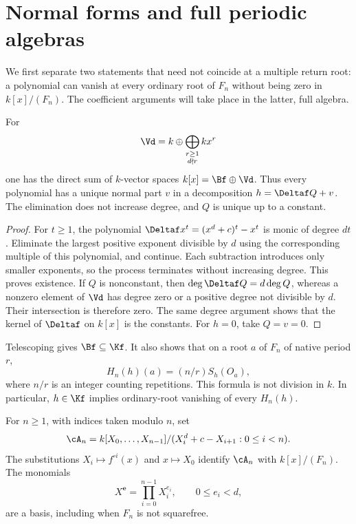\section{Normal forms and full periodic algebras}
\label{sec:algebra}

We first separate two statements that need not coincide at a
multiple return root: a polynomial can vanish at every ordinary
root of $F_n$ without being zero in $k[x]/(F_n)$. The coefficient
arguments will take place in the latter, full algebra.

\begin{lemma}
\label{lem:normal}
For
\[
 \Vd=k\oplus\bigoplus_{\substack{r\ge1\\d\nmid r}}kx^r
\]
one has the direct sum of $k$-vector spaces
$k[x]=\Bf\oplus\Vd$. Thus every polynomial has a unique normal
part $v$ in a decomposition $h=\Deltaf Q+v$. The elimination
does not increase degree, and $Q$ is unique up to a constant.
\end{lemma}

\begin{proof}
For $t\ge1$, the polynomial
$\Deltaf x^t=(x^d+c)^t-x^t$ is monic of degree $dt$.
Eliminate the largest positive exponent divisible by $d$ using
the corresponding multiple of this polynomial, and continue.
Each subtraction introduces only smaller exponents, so the
process terminates without increasing degree. This proves existence.
If $Q$ is nonconstant, then $\deg\Deltaf Q=d\deg Q$,
whereas a nonzero element of $\Vd$ has degree zero or a positive
degree not divisible by $d$. Their intersection is therefore zero.
The same degree argument shows that the kernel of $\Deltaf$ on
$k[x]$ is the constants. For $h=0$, take $Q=v=0$.
\end{proof}

Telescoping gives $\Bf\subseteq\Kf$. It also shows that on a
root $a$ of $F_n$ of native period $r$,
\begin{equation}
 H_n(h)(a)=(n/r)S_h(O_a),
 \label{eq:ordinary-repetition}
\end{equation}
where $n/r$ is an integer counting repetitions. This formula is
not division in $k$. In particular, $h\in\Kf$ implies ordinary-root
vanishing of every $H_n(h)$.

\begin{lemma}
\label{lem:basis}
For $n\ge1$, with indices taken modulo $n$, set
\[
 \cA_n=k[X_0,\ldots,X_{n-1}]/
       (X_i^d+c-X_{i+1}:0\le i<n).
\]
The substitutions $X_i\mapsto f^{\circ i}(x)$ and
$x\mapsto X_0$ identify $\cA_n$ with $k[x]/(F_n)$. The
monomials
\begin{equation}
 X^{\mathbf e}=\prod_{i=0}^{n-1}X_i^{e_i},\qquad
                  0\le e_i<d,
 \label{eq:digit-basis}
\end{equation}
are a basis, including when $F_n$ is not squarefree.
\end{lemma}

